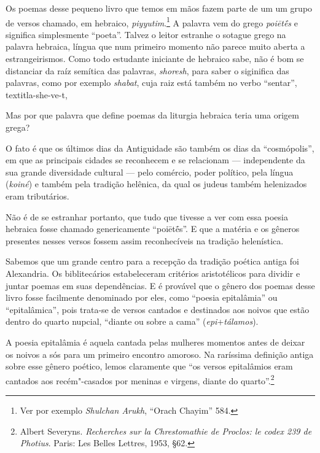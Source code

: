 
\noindent{}Os poemas desse pequeno livro que temos em mãos fazem parte de um
um grupo de versos chamado, em hebraico, 
\emph{piyyutim}.\footnote{Ver por exemplo \emph{Shulchan Arukh}, ``Orach Chayim'' 584.}
A palavra vem do grego \emph{poiētḗs} e significa
simplesmente ``poeta''. Talvez o leitor estranhe o sotague grego
na palavra hebraica, língua que num primeiro momento não parece muito 
aberta a estrangeirismos. Como todo estudante iniciante de hebraico sabe, não é bom se distanciar da
raíz semítica das palavras, \textit{shoresh}, para saber o siginifica das palavras, como por exemplo \textit{shabat}, 
cuja raiz está também no verbo ``sentar'', textit{la-she-ve-t}, 

Mas por que palavra que define poemas da liturgia hebraica teria uma origem grega?

O fato é que os últimos dias da Antiguidade são também os dias da ``cosmópolis'', em que 
as principais cidades se reconhecem e se relacionam — independente da sua grande diversidade
cultural — pelo comércio, poder político, pela língua (\textit{koiné}) e também pela tradição helênica, 
da qual os judeus também helenizados eram tributários. 

Não é de se estranhar portanto, que tudo que tivesse a ver com essa poesia hebraica fosse chamado genericamente ``poiētḗs''. 
E que a matéria e os gêneros presentes nesses versos fossem assim reconhecíveis na tradição helenística.

Sabemos que um grande centro para a recepção da tradição poética antiga foi 
Alexandria. Os biblitecários estabeleceram critérios aristotélicos para 
dividir e juntar poemas em suas dependências. E é provável que o gênero dos poemas desse livro 
fosse facilmente denominado por eles, como ``poesia epitalâmia'' ou
``epitalâmica'', pois trata-se de versos cantados e destinados aos noivos que estão dentro do quarto nupcial, 
``diante ou sobre a cama'' (\textit{epi}+\textit{tálamos}).


A poesia epitalâmia é aquela cantada pelas mulheres momentos antes de deixar os noivos a sós para
um primeiro encontro amoroso. Na raríssima definição antiga sobre esse gênero
poético, lemos claramente que ``os versos
epitalâmios eram cantados aos recém"-casados por meninas e virgens,
diante do quarto''.\footnote{Albert Severyns. \emph{Recherches sur la Chrestomathie de Proclos: le codex 239 de Photius}. Paris: Les Belles Lettres, 1953, §62.}

